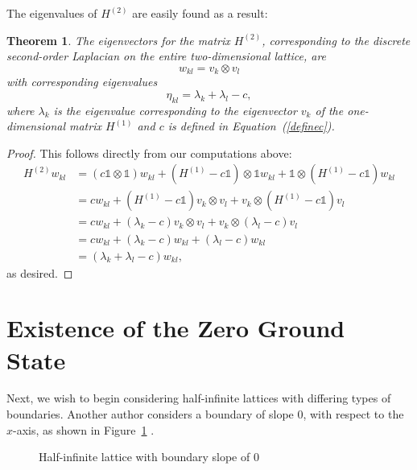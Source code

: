 \documentclass{article}
\newtheorem{theorem}{Theorem}
\numberwithin{equation}{section}
\numberwithin{theorem}{section}
\numberwithin{proposition}{section}
\numberwithin{lemma}{section}
\numberwithin{corollary}{section}
\numberwithin{definition}{section}
\begin{document}
The eigenvalues of $H^{(2)}$ are easily found as a result:

\begin{theorem}

The eigenvectors for the matrix $H^{(2)}$, corresponding to the discrete second-order Laplacian on the entire two-dimensional lattice, are
\begin{equation}
	w_{kl} = v_k \otimes v_l
\end{equation}
with corresponding eigenvalues
\begin{equation}
	\eta_{kl} = \lambda_k + \lambda_l - c,
\end{equation}
where $\lambda_k$ is the eigenvalue corresponding to the eigenvector $v_k$ of the one-dimensional matrix $H^{(1)}$ and $c$ is defined in Equation~(\ref{definec}).
\end{theorem}
\begin{proof}
This follows directly from our computations above:
	\begin{align*}
	H^{(2)} w_{kl} &= (c\mathds{1} \otimes \mathds{1}) w_{kl} + (H^{(1)} - c\mathds{1}) \otimes \mathds{1} w_{kl} + \mathds{1} \otimes (H^{(1)} - c\mathds{1}) w_{kl} \\
		&= cw_{kl} + (H^{(1)} - c\mathds{1}) v_k \otimes v_l + v_k \otimes (H^{(1)} - c\mathds{1})v_l \\
		&= cw_{kl} + (\lambda_k - c) v_k \otimes v_l + v_k \otimes (\lambda_l - c)v_l \\
		&= cw_{kl} + (\lambda_k - c) w_{kl} + (\lambda_l - c)w_{kl} \\
		&= (\lambda_k + \lambda_l - c) w_{kl},
	\end{align*}
as desired.
\end{proof}

\section{Existence of the Zero Ground State}

Next, we wish to begin considering half-infinite lattices with differing types of boundaries. Another author considers a boundary of slope 0, with respect to the $x$-axis, as shown in Figure~\ref{slope0} \cite{young}.

\begin{figure}
	\caption{Half-infinite lattice with boundary slope of 0 		\label{slope0}}
	\centering
\end{figure}
\end{document}
